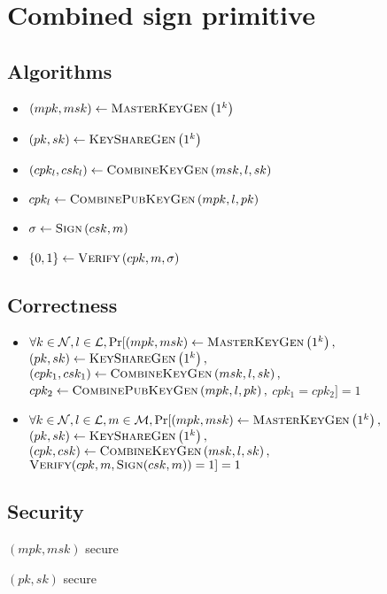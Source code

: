 \section{Combined sign primitive}
  \subsection{Algorithms}
    \begin{itemize}
      \item $\left(mpk, msk\right) \gets \textsc{MasterKeyGen}\left(1^k\right)$
      \item $\left(pk, sk\right) \gets \textsc{KeyShareGen}\left(1^k\right)$
      \item $\left(cpk_l, csk_l\right) \gets \textsc{CombineKeyGen}\left(msk, l,
      sk\right)$
      \item $cpk_l \gets \textsc{CombinePubKeyGen}\left(mpk, l, pk\right)$
      \item $\sigma \gets \textsc{Sign}\left(csk, m\right)$
      \item $\left\{0, 1\right\} \gets \textsc{Verify}\left(cpk, m,
      \sigma\right)$
    \end{itemize}

  \subsection{Correctness}
    \begin{itemize}
      \item $\forall k \in \mathcal{N}, l \in \mathcal{L},
      \Pr[(mpk, msk) \gets \textsc{MasterKeyGen}\left(1^k\right),$
      $\left(pk, sk\right) \gets \textsc{KeyShareGen}\left(1^k\right),$
      $\left(cpk_1, csk_1\right) \gets \textsc{CombineKeyGen}\left(msk, l,
      sk\right),$ \\
      $cpk_2 \gets \textsc{CombinePubKeyGen}\left(mpk, l, pk\right),$
      $cpk_1 = cpk_2] = 1$

      \item $\forall k \in \mathcal{N}, l \in \mathcal{L}, m \in \mathcal{M},
      \Pr[(mpk, msk) \gets \textsc{MasterKeyGen}\left(1^k\right),$
      $\left(pk, sk\right) \gets \textsc{KeyShareGen}\left(1^k\right),$
      $\left(cpk, csk\right) \gets \textsc{CombineKeyGen}\left(msk, l,
      sk\right),$
      $\textsc{Verify}(cpk, m, \textsc{Sign}(csk, m)) = 1] = 1$
    \end{itemize}

  \subsection{Security}
    \begin{gamebox}{$(mpk, msk)$ secure}
    \end{gamebox}

    \begin{gamebox}{$(pk, sk)$ secure}
    \end{gamebox}

